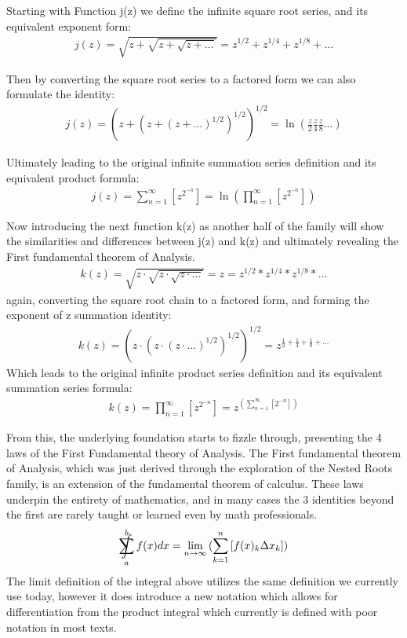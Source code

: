 \documentclass{article}
\DeclareMathOperator*{\SumInt}{%
\mathchoice%
  {\ooalign{$\displaystyle\sum$\cr\hidewidth$\displaystyle\int$\hidewidth\cr}}
  {\ooalign{\raisebox{.14\height}{\scalebox{.7}{$\textstyle\sum$}}\cr\hidewidth$\textstyle\int$\hidewidth\cr}}
  {\ooalign{\raisebox{.2\height}{\scalebox{.6}{$\scriptstyle\sum$}}\cr$\scriptstyle\int$\cr}}
  {\ooalign{\raisebox{.2\height}{\scalebox{.6}{$\scriptstyle\sum$}}\cr$\scriptstyle\int$\cr}}
}
\newcommand{\sidesum}[2]{\displaystyle\sum\nolimits_{\scriptstyle #1}^{\scriptstyle #2}}
\begin{document}
Starting with Function j(z) we define the infinite square root series, and its equivalent exponent form:
\begin{align*}
j(z) = \sqrt{z + \sqrt{z + \sqrt{z + \ldots}}} = z^{1/2} + z^{1/4} + z^{1/8} + \ldots
\end{align*}

Then by converting the square root series to a factored form we can also formulate the identity:
\begin{align*}
j(z) = \left(z + \left(z + \left(z + \ldots\right)^{1/2}\right)^{1/2}\right)^{1/2} = \ln(\frac{z}{2}\frac{z}{4}\frac{z}{8}\ldots)
\end{align*}

Ultimately leading to the original infinite summation series definition and its equivalent product formula:
\begin{align*}
j(z) = \sum_{n=1}^{\infty} \left[z^{2^{-n}}\right] = \ln\left(\prod_{n=1}^{\infty} \left[z^{2^{-n}}\right]\right)
\end{align*}

Now introducing the next function k(z) as another half of the family will show the similarities and differences between j(z) and k(z) and ultimately revealing the First fundamental theorem of Analysis.
\begin{align*}
k(z) = \sqrt{z \cdot \sqrt{z \cdot \sqrt{z \cdot \ldots}}} = z = z^{1/2} * z^{1/4} * z^{1/8} * \ldots
\end{align*}
again, converting the square root chain to a factored form, and forming the exponent of z summation identity:
\begin{align*}
k(z) = \left(z \cdot \left(z \cdot \left(z \cdot \ldots\right)^{1/2}\right)^{1/2}\right)^{1/2} = z^{\frac{1}{2} + \frac{1}{4} + \frac{1}{8} + \ldots}
\end{align*}
Which leads to the original infinite product series definition and its equivalent summation series formula:
\begin{align*}
k(z) = \prod_{n=1}^{\infty} \left[z^{2^{-n}}\right] = z^{(\sidesum{n=1}{\infty}[2^{-n}])}
\end{align*}

From this, the underlying foundation starts to fizzle through, presenting the 4 laws of the First Fundamental theory of Analysis.
The First fundamental theorem of Analysis, which was just derived through the exploration of the Nested Roots family, is an extension of the fundamental theorem of calculus. These laws underpin the entirety of mathematics, and in many cases the 3 identities beyond the first are rarely taught or learned even by math professionals.
\begin{align*}
\SumInt_{a}^{b} f(x) dx = \lim_{n \to \infty}{(\sum_{k=1}^{n} \left[f(x)_{k}\Delta x_{k} \right])}
\end{align*}
The limit definition of the integral above utilizes the same definition we currently use today, however it does introduce a new notation which allows for differentiation from the product integral which currently is defined with poor notation in most texts.
\end{document}
